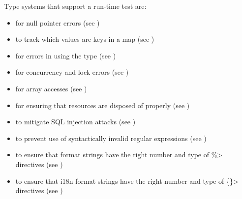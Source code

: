 
Type systems that support a run-time test are:
\begin{itemize}
\item
   for null pointer errors
  (see )
\item
   to track which values are
  keys in a map (see )
\item
   for errors in using the
   type (see
  )
\item
   for concurrency and lock errors
  (see )
\item
   for array accesses
  (see )
\item
   for ensuring that resources are disposed of properly
  (see )
\item
   to mitigate SQL injection
  attacks
  (see )
\item
   to prevent use of syntactically
  invalid regular expressions (see )
\item
   to ensure that format
  strings have the right number and type of \<\%> directives (see
  )
\item
  to ensure that i18n format strings have the right number and type of
  \<\{\}> directives (see )
\end{itemize}


